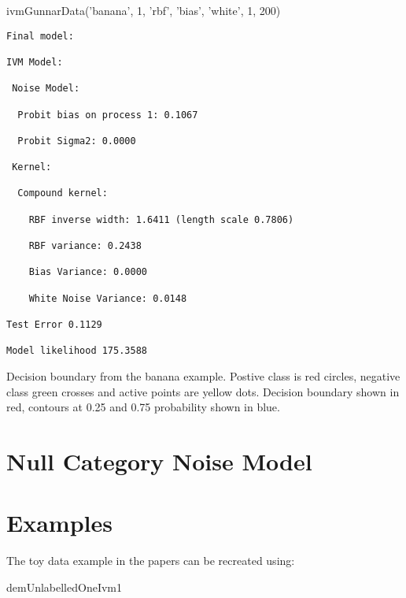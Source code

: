 \begin{octave}

 ivmGunnarData('banana', 1, {'rbf', 'bias', 'white'}, 1, 200)
\end{octave}

\begin{verbatim}
Final model:

IVM Model:

 Noise Model:

  Probit bias on process 1: 0.1067

  Probit Sigma2: 0.0000

 Kernel:

  Compound kernel:

    RBF inverse width: 1.6411 (length scale 0.7806)

    RBF variance: 0.2438

    Bias Variance: 0.0000

    White Noise Variance: 0.0148

Test Error 0.1129

Model likelihood 175.3588

\end{verbatim}





\begin{center}

Decision boundary from the banana example. Postive class is red circles, negative class green crosses and active points are yellow dots. Decision boundary shown in red, contours at 0.25 and 0.75 probability shown in blue.
\end{center}



\section{Null Category Noise Model}



\section{Examples}



The toy data example in the papers can be recreated using:



\begin{octave}

 demUnlabelledOneIvm1

\end{octave}



